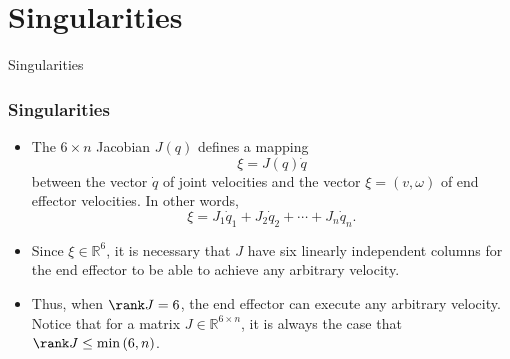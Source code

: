 \section{Singularities}

\begin{frame}
    Singularities


\end{frame}

\begingroup
\small


\begin{frame}
    \frametitle{Singularities}

    \begin{itemize}
        \item The $6 \times n$ Jacobian $J(q)$ defines a mapping \[ \xi =
        J(q)\dot{q} \] between the vector $\dot{q}$ of joint velocities and the
        vector $\xi = (v, \omega)$ of end effector velocities. In other words,
        \[ \xi = J_1 \dot{q}_1 + J_2 \dot{q}_2 + \cdots + J_n \dot{q}_n. \]
        \item Since $\xi \in \mathbb{R}^6$, it is necessary that $J$ have six 
        linearly independent columns for the end effector to be able to achieve 
        any arbitrary velocity.
        \item Thus, when $\rank J = 6$, the end effector can execute any
        arbitrary velocity. Notice that for a matrix $J \in \mathbb{R}^{6 \times
        n}$, it is always the case that $\rank J \leq \min{(6, n)}$.
    \end{itemize}
\end{frame}


